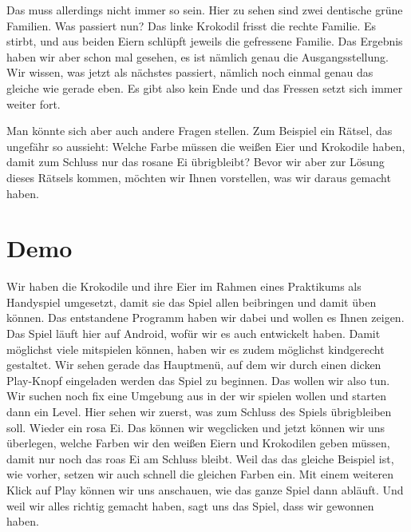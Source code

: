 \documentclass{scrartcl}
\begin{document}
	Das muss allerdings nicht immer so sein.
	Hier zu sehen sind zwei dentische grüne Familien.
	Was passiert nun?
	Das linke Krokodil frisst die rechte Familie.
	Es stirbt, und aus beiden Eiern schlüpft jeweils die gefressene Familie.
	Das Ergebnis haben wir aber schon mal gesehen, es ist nämlich genau die Ausgangsstellung.
	Wir wissen, was jetzt als nächstes passiert, nämlich noch einmal genau das gleiche wie gerade eben.
	Es gibt also kein Ende und das Fressen setzt sich immer weiter fort.

	Man könnte sich aber auch andere Fragen stellen.
	Zum Beispiel ein Rätsel, das ungefähr so aussieht:
	Welche Farbe müssen die weißen Eier und Krokodile haben, damit zum Schluss nur das rosane Ei übrigbleibt?
	Bevor wir aber zur Lösung dieses Rätsels kommen, möchten wir Ihnen vorstellen, was wir daraus gemacht haben.


	\section{Demo}
	Wir haben die Krokodile und ihre Eier im Rahmen eines Praktikums als Handyspiel umgesetzt, damit sie das Spiel allen beibringen und damit üben können.
	Das entstandene Programm haben wir dabei und wollen es Ihnen zeigen.
	Das Spiel läuft hier auf Android, wofür wir es auch entwickelt haben.
	Damit möglichst viele mitspielen können, haben wir es zudem möglichst kindgerecht gestaltet.
	Wir sehen gerade das Hauptmenü, auf dem wir durch einen dicken Play-Knopf eingeladen werden das Spiel zu beginnen.
	Das wollen wir also tun.
	Wir suchen noch fix eine Umgebung aus in der wir spielen wollen und starten dann ein Level.
	Hier sehen wir zuerst, was zum Schluss des Spiels übrigbleiben soll.
	Wieder ein rosa Ei.
	Das können wir wegclicken und jetzt können wir uns überlegen, welche Farben wir den weißen Eiern und Krokodilen geben müssen, damit nur noch das roas Ei am Schluss bleibt.
	Weil das das gleiche Beispiel ist, wie vorher, setzen wir auch schnell die gleichen Farben ein.
	Mit einem weiteren Klick auf Play können wir uns anschauen, wie das ganze Spiel dann abläuft.
	Und weil wir alles richtig gemacht haben, sagt uns das Spiel, dass wir gewonnen haben.
\end{document}
